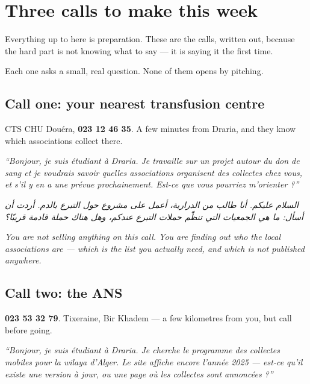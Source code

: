 \documentclass[11pt,a4paper]{article}
\newcommand{\ar}[1]{{\upshape\textarabic{#1}}}
\newcommand{\note}[1]{{\small\color{qatraGrey}\textit{#1}}}
\newenvironment{say}
  {\par\medskip\noindent\begin{lrbox}{\saybox}%
   \begin{minipage}{\dimexpr\textwidth-2\fboxsep-2pt}\itshape\vspace{4pt}}
  {\vspace{4pt}\end{minipage}\end{lrbox}%
   \fcolorbox{rule}{sayBg}{\usebox{\saybox}}\par\medskip}
\begin{document}
\section{Three calls to make this week}

Everything up to here is preparation. These are the calls, written out, because
the hard part is not knowing what to say --- it is saying it the first time.

Each one asks a small, real question. None of them opens by pitching.

\subsection{Call one: your nearest transfusion centre}

CTS CHU Dou\'era, \textbf{023 12 46 35}. A few minutes from Draria, and they know
which associations collect there.

\begin{say}
``Bonjour, je suis \'etudiant \`a Draria. Je travaille sur un projet autour du don
de sang et je voudrais savoir quelles associations organisent des collectes chez
vous, et s'il y en a une pr\'evue prochainement. Est-ce que vous pourriez
m'orienter ?''
\end{say}

\begin{say}
\ar{السلام عليكم. أنا طالب من الدرارية، أعمل على مشروع حول التبرع بالدم. أردت أن أسأل: ما هي الجمعيات التي تنظّم حملات التبرع عندكم، وهل هناك حملة قادمة قريبًا؟}
\end{say}

\note{You are not selling anything on this call. You are finding out who the
local associations are --- which is the list you actually need, and which is not
published anywhere.}

\subsection{Call two: the ANS}

\textbf{023 53 32 79}. Tixeraine, Bir Khadem --- a few kilometres from you, but
call before going.

\begin{say}
``Bonjour, je suis \'etudiant \`a Draria. Je cherche le programme des collectes
mobiles pour la wilaya d'Alger. Le site affiche encore l'ann\'ee 2025 --- est-ce
qu'il existe une version \`a jour, ou une page o\`u les collectes sont annonc\'ees ?''
\end{say}
\end{document}
